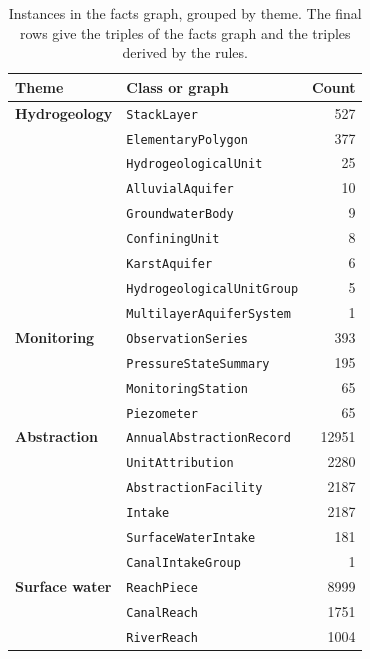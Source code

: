 \begin{table}[p]
\centering
\scriptsize
\caption{Instances in the facts graph, grouped by theme. The final rows give the triples of the facts graph and the triples derived by the rules.}
\label{tab:kg-instances}
\begin{tabular}{@{}llr@{}}
\toprule
Theme & Class or graph & Count \\
\midrule
\textbf{Hydrogeology} & \texttt{StackLayer} & \num{527} \\
 & \texttt{ElementaryPolygon} & \num{377} \\
 & \texttt{HydrogeologicalUnit} & \num{25} \\
 & \texttt{AlluvialAquifer} & \num{10} \\
 & \texttt{GroundwaterBody} & \num{9} \\
 & \texttt{ConfiningUnit} & \num{8} \\
 & \texttt{KarstAquifer} & \num{6} \\
 & \texttt{HydrogeologicalUnitGroup} & \num{5} \\
 & \texttt{MultilayerAquiferSystem} & \num{1} \\
\addlinespace
\textbf{Monitoring} & \texttt{ObservationSeries} & \num{393} \\
 & \texttt{PressureStateSummary} & \num{195} \\
 & \texttt{MonitoringStation} & \num{65} \\
 & \texttt{Piezometer} & \num{65} \\
\addlinespace
\textbf{Abstraction} & \texttt{AnnualAbstractionRecord} & \num{12951} \\
 & \texttt{UnitAttribution} & \num{2280} \\
 & \texttt{AbstractionFacility} & \num{2187} \\
 & \texttt{Intake} & \num{2187} \\
 & \texttt{SurfaceWaterIntake} & \num{181} \\
 & \texttt{CanalIntakeGroup} & \num{1} \\
\addlinespace
\textbf{Surface water} & \texttt{ReachPiece} & \num{8999} \\
 & \texttt{CanalReach} & \num{1751} \\
 & \texttt{RiverReach} & \num{1004} \\

\end{tabular}
\end{table}

